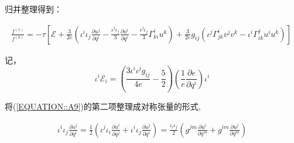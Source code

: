 \documentclass[LBMDerivation.tex]{subfiles}
\begin{document}



归并整理得到：


\begin{equation}
  \begin{gathered}
    \frac{f^{(1)}}{f^{(0)}}=
    -\tau [ \mathcal{E}
      +\frac{3}{2e}(\iota^i \iota_j \frac{\partial u^j}{\partial q^i} -\frac{\iota^j\iota_j}{3}\frac{\partial u^i}{\partial q^i}-\frac{\iota^j\iota_j}{3} \Gamma_{ki}^i u^k)
      + \frac{3}{2e} g_{ij} (\iota^j\Gamma_{j k}^{i} v^j v^k - \iota^i\Gamma_{i k}^{j} u^i u^k)
    ]
  \end{gathered}
  \label{EQUATION::A9} ~
\end{equation}

记，
$$
  \iota^i \mathcal{E}_i= (\frac{3 {\iota^i\iota^jg_{ij}}}{4e}-\frac{5}{2}) (\frac{1}{e}\frac{\partial e}{\partial q^i})\iota^i
$$


将(\ref{EQUATION::A9})的第二项整理成对称张量的形式,


\begin{equation}
  \begin{gathered}
    \iota^i \iota_j \frac{\partial u^j}{\partial q^i} =\frac{1}{2} (\iota^j \iota_i \frac{\partial u^i}{\partial q^j}+  \iota^i \iota_j \frac{\partial u^j}{\partial q^i})
    = \frac{\iota_i \iota_j}{2} (g^{jm} \frac{\partial u^i}{\partial q^m}+g^{im} \frac{\partial u^j}{\partial q^m})
  \end{gathered}
\end{equation}
\end{document}
